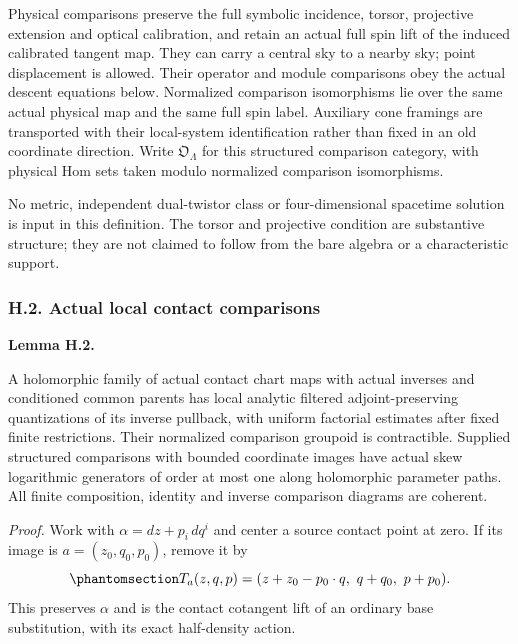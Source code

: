 \documentclass[
  english,
  11pt,
  reqno]{amsart}
\makeatletter
\newcommand{\pandocstatementheading}[1]{%
  \par\addpenalty{\@beginparpenalty}%
  \addvspace{.5\baselineskip plus .2\baselineskip minus .2\baselineskip}%
  {\normalfont\bfseries #1\par}%
  \nobreak\@afterindenttrue\@afterheading
}
\makeatother
\begin{document}
Physical comparisons preserve the full symbolic incidence, torsor,
projective extension and optical calibration, and retain an actual full
spin lift of the induced calibrated tangent map. They can carry a
central sky to a nearby sky; point displacement is allowed. Their
operator and module comparisons obey the actual descent equations below.
Normalized comparison isomorphisms lie over the same actual physical map
and the same full spin label. Auxiliary cone framings are transported
with their local-system identification rather than fixed in an old
coordinate direction. Write \(\mathfrak O_\Lambda\) for this structured
comparison category, with physical Hom sets taken modulo normalized
comparison isomorphisms.

No metric, independent dual-twistor class or four-dimensional spacetime
solution is input in this definition. The torsor and projective
condition are substantive structure; they are not claimed to follow from
the bare algebra or a characteristic support.

\protect{}\label{sec:gg-general-relative-qct}

\subsubsection{H.2. Actual local contact
comparisons}\label{h.2.-actual-local-contact-comparisons}

\pandocstatementheading{\protect{}\label{lem:gg-general-relative-qct}Lemma H.2.}

A holomorphic family of actual contact chart maps with actual inverses
and conditioned common parents has local analytic filtered
adjoint-preserving quantizations of its inverse pullback, with uniform
factorial estimates after fixed finite restrictions. Their normalized
comparison groupoid is contractible. Supplied structured comparisons
with bounded coordinate images have actual skew logarithmic generators
of order at most one along holomorphic parameter paths. All finite
composition, identity and inverse comparison diagrams are coherent.

\emph{Proof.} Work with \(\alpha=dz+p_i\,dq^i\) and center a source
contact point at zero. If its image is \(a=(z_0,q_0,p_0)\), remove it by
\begin{equation}\protect\phantomsection\label{eq:gg-qct-contact-translation}{
 T_a(z,q,p)=(z+z_0-p_0\cdot q,\ q+q_0,\ p+p_0).
}\end{equation} This preserves \(\alpha\) and is the contact cotangent
lift of an ordinary base substitution, with its exact half-density
action.
\end{document}
